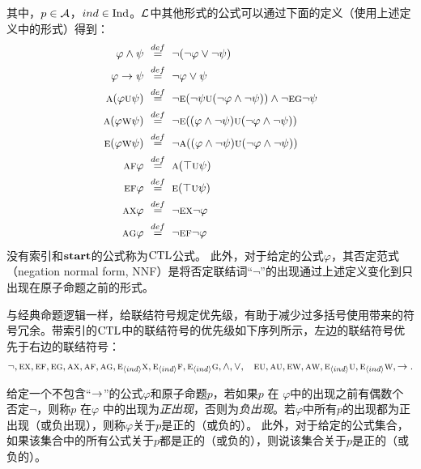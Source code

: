 其中，$p\in {\cal A}$，$ind \in \textrm{Ind}$。$\cal L$中其他形式的公式可以通过下面的定义（使用上述定义中的形式）得到：
\begin{alignat}{2}
	\varphi \wedge \psi& \ \overset{def}{=}\ \neg (\neg \varphi \vee \neg \psi)\\
	\varphi \rto \psi& \ \overset{def}{=}\ \neg \varphi \vee \psi\\
	\ALL(\varphi \UNTILL \psi)& \ \overset{def}{=}\ \neg\EXIST(\neg \psi \UNTILL(\neg \varphi \wedge \neg \psi)) \wedge \neg \EXIST \GLOBAL \neg \psi\\
	\ALL(\varphi \UNLESS \psi)& \ \overset{def}{=}\  \neg\EXIST((\varphi \wedge \neg \psi) \UNTILL (\neg \varphi \wedge \neg \psi))\\
	\EXIST(\varphi \UNLESS \psi)& \ \overset{def}{=}\  \neg\ALL((\varphi \wedge \neg \psi) \UNTILL (\neg \varphi \wedge \neg \psi))\\
	\ALL\FUTURE \varphi& \ \overset{def}{=}\ 	\ALL(\top \UNTILL \psi)\\
	\EXIST\FUTURE \varphi& \ \overset{def}{=}\ \EXIST(\top \UNTILL \psi)\\
	\ALL \NEXT \varphi& \ \overset{def}{=}\  \neg \EXIST \NEXT \neg \varphi\\
	\ALL \GLOBAL \varphi& \ \overset{def}{=}\  \neg \EXIST \FUTURE \neg \varphi
\end{alignat}
没有索引和$\textbf{start}$的公式称为$\textrm{CTL}$公式。
此外，对于给定的公式$\varphi$，其否定范式（negation normal form, NNF）是将否定联结词“$\neg$”的出现通过上述定义变化到只出现在原子命题之前的形式。

与经典命题逻辑一样，给联结符号规定优先级，有助于减少过多括号使用带来的符号冗余。带索引的$\textrm{CTL}$中的联结符号的优先级如下序列所示，左边的联结符号优先于右边的联结符号：
\begin{align*}
	& \neg, \textsc{e}\textsc{x}, \textsc{e}\textsc{f}, \textsc{e}\textsc{g}, \textsc{a}\textsc{x}, \textsc{a}\textsc{f}, \textsc{a}\textsc{g}, \textsc{e}_{{\langle{ind}\rangle}}\textsc{x}, \textsc{e}_{{\langle{ind}\rangle}}\textsc{f}, \textsc{e}_{{\langle{ind}\rangle}}\textsc{g}
	,\land, \lor,
	& \textsc{e}\textsc{u}, \textsc{a}\textsc{u}, \textsc{e} \textsc{w}, \textsc{a}\textsc{w}, \textsc{e}_{{\langle{ind}\rangle}}\textsc{u}, \textsc{e}_{{\langle{ind}\rangle}} \textsc{w}, \rightarrow.
\end{align*}

给定一个不包含“$\rightarrow$”的公式$\varphi$和原子命题$p$，若如果$p$ 在 $\varphi$中的出现之前有偶数个否定$\neg$，则称$p$ 在$\varphi$ 中的出现为\emph{正出现}，否则为\emph{负出现}。若$\varphi$中所有$p$的出现都为正出现（或负出现），则称$\varphi$关于$p$是正的（或负的）。
此外，对于给定的公式集合，如果该集合中的所有公式关于$p$都是正的（或负的），则说该集合关于$p$是正的（或负的）。

